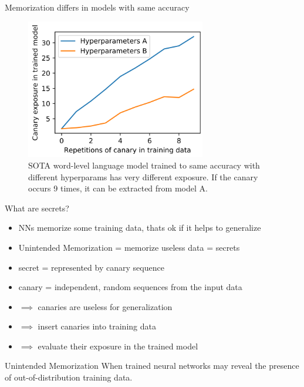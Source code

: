\documentclass{beamer}
\begin{document}
\begin{frame}{Memorization differs in models with same accuracy}

\begin{figure}[h]
\includegraphics[width=0.7\textwidth]{img/fig1}
\caption{SOTA word-level language model trained to same accuracy with different hyperparams has very different exposure. If the canary occurs 9 times, it can be extracted from model A.}
\end{figure}

\end{frame}
\begin{frame}{What are secrets?}

\begin{itemize}
\item NNs memorize some training data, thats ok if it helps to generalize
\item Unintended Memorization = memorize useless data = secrets
\item secret = represented by canary sequence
\item canary = independent, random sequences from the input data
\item $\implies$ canaries are useless for generalization 
\item $\implies$ insert canaries into training data
\item $\implies$ evaluate their exposure in the trained model
\end{itemize}

\vfill

\begin{block}{Unintended Memorization}
When trained neural networks may reveal the presence of out-of-distribution training data.
\end{block}

\end{frame}
\end{document}
